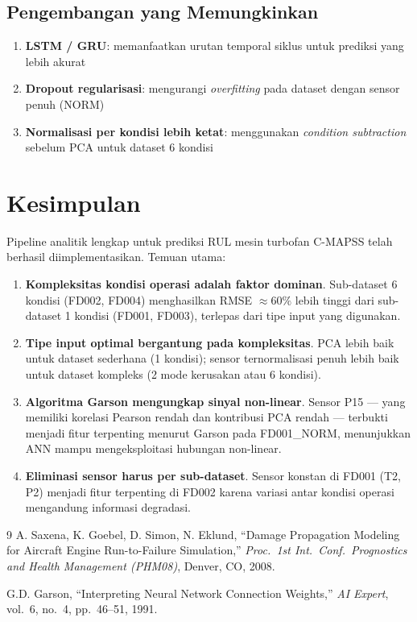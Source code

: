 \documentclass[11pt,a4paper]{article}
\begin{document}
\subsection{Pengembangan yang Memungkinkan}

\begin{enumerate}[noitemsep]
  \item \textbf{LSTM / GRU}: memanfaatkan urutan temporal siklus untuk
    prediksi yang lebih akurat
  \item \textbf{Dropout regularisasi}: mengurangi \textit{overfitting} pada
    dataset dengan sensor penuh (NORM)
  \item \textbf{Normalisasi per kondisi lebih ketat}: menggunakan
    \textit{condition subtraction} sebelum PCA untuk dataset 6 kondisi
\end{enumerate}

\section{Kesimpulan}

Pipeline analitik lengkap untuk prediksi RUL mesin turbofan C-MAPSS telah
berhasil diimplementasikan. Temuan utama:

\begin{enumerate}[noitemsep]
  \item \textbf{Kompleksitas kondisi operasi adalah faktor dominan}.
    Sub-dataset 6 kondisi (FD002, FD004) menghasilkan RMSE $\approx 60\%$
    lebih tinggi dari sub-dataset 1 kondisi (FD001, FD003),
    terlepas dari tipe input yang digunakan.

  \item \textbf{Tipe input optimal bergantung pada kompleksitas}.
    PCA lebih baik untuk dataset sederhana (1 kondisi); sensor ternormalisasi
    penuh lebih baik untuk dataset kompleks (2 mode kerusakan atau 6 kondisi).

  \item \textbf{Algoritma Garson mengungkap sinyal non-linear}.
    Sensor P15 --- yang memiliki korelasi Pearson rendah dan kontribusi PCA
    rendah --- terbukti menjadi fitur terpenting menurut Garson pada
    FD001\_NORM, menunjukkan ANN mampu mengeksploitasi hubungan non-linear.

  \item \textbf{Eliminasi sensor harus per sub-dataset}.
    Sensor konstan di FD001 (T2, P2) menjadi fitur terpenting di FD002
    karena variasi antar kondisi operasi mengandung informasi degradasi.
\end{enumerate}

\begin{thebibliography}{9}
  A. Saxena, K. Goebel, D. Simon, N. Eklund,
  ``Damage Propagation Modeling for Aircraft Engine Run-to-Failure Simulation,''
  \textit{Proc.\ 1st Int.\ Conf.\ Prognostics and Health Management (PHM08)},
  Denver, CO, 2008.

  G.D. Garson,
  ``Interpreting Neural Network Connection Weights,''
  \textit{AI Expert}, vol.~6, no.~4, pp.~46--51, 1991.
\end{thebibliography}
\end{document}
